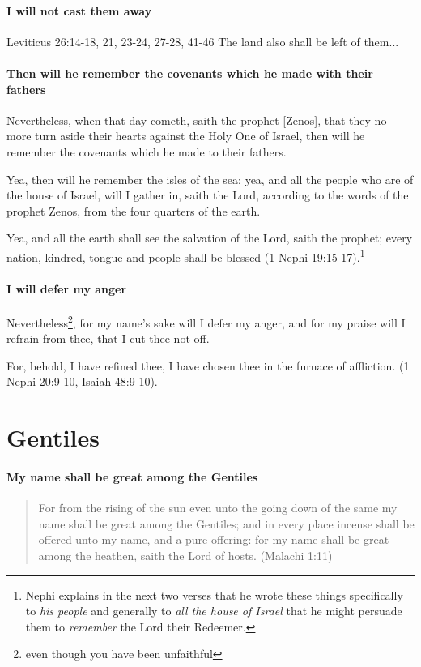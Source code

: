 \paragraph{I will not cast them away}
Leviticus 26:14-18, 21, 23-24, 27-28, 41-46
The land also shall be left of them...

\paragraph{Then will he remember the covenants which he made with their fathers}
Nevertheless, when that day cometh, saith the prophet [Zenos], that they no more turn aside their hearts against the Holy One of Israel, then will he remember the covenants which he made to their fathers.

Yea, then will he remember the isles of the sea; yea, and all the people who are of the house of Israel, will I gather in, saith the Lord, according to the words of the prophet Zenos, from the four quarters of the earth.

Yea, and all the earth shall see the salvation of the Lord, saith the prophet; every nation, kindred, tongue and people shall be blessed (1 Nephi 19:15-17).\footnote{Nephi explains in the next two verses that he wrote these things specifically to \textit{his people} and generally to \textit{all the house of Israel} that he might persuade them to \textit{remember} the Lord their Redeemer.}

\paragraph{I will defer my anger}
Nevertheless\footnote{even though you have been unfaithful}, for my name's sake will I defer my anger, and for my praise will I refrain from thee, that I cut thee not off.

For, behold, I have refined thee, I have chosen thee in the furnace of affliction. (1 Nephi 20:9-10, Isaiah 48:9-10).

\section{Gentiles}

\paragraph{My name shall be great among the Gentiles}
\begin{quotation}
For from the rising of the sun even unto the going down of the same my name shall be great among the Gentiles; and in every place incense shall be offered unto my name, and a pure offering: for my name shall be great among the heathen, saith the Lord of hosts. (Malachi 1:11)
\end{quotation}

